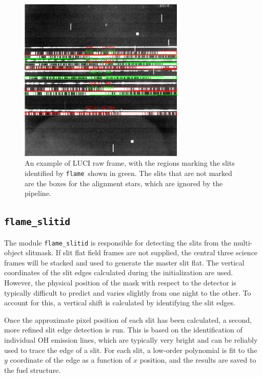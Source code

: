 \documentclass[a4paper]{article}
\newcommand{\flame}{\texttt{flame}}
\begin{document}
\begin{figure}[htbp]
\centering
\includegraphics[width=0.7\textwidth]{slits}
\caption{An example of LUCI raw frame, with the regions marking the slits identified by \flame\ shown in green. The slits that are not marked are the boxes for the alignment stars, which are ignored by the pipeline.}
\label{fig:slits}
\end{figure}

\subsection{\texttt{flame\_slitid}}
\label{sec:slitid}

The module \texttt{flame\_slitid} is responsible for detecting the slits from the multi-object slitmask. If slit flat field frames are not supplied, the central three science frames will be stacked and used to generate the master slit flat. The vertical coordinates of the slit edges calculated during the initialization are used. However, the physical position of the mask with respect to the detector is typically difficult to predict and varies slightly from one night to the other. To account for this, a vertical shift is calculated by identifying the slit edges.

Once the approximate pixel position of each slit has been calculated, a second, more refined slit edge detection is run. This is based on the identification of individual OH emission lines, which are typically very bright and can be reliably used to trace the edge of a slit. For each slit, a low-order polynomial is fit to the $y$ coordinate of the edge as a function of $x$ position, and the results are saved to the fuel structure.
\end{document}
